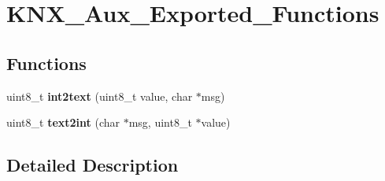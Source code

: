 \hypertarget{group___k_n_x___aux___exported___functions}{}\section{K\+N\+X\+\_\+\+Aux\+\_\+\+Exported\+\_\+\+Functions}
\label{group___k_n_x___aux___exported___functions}
\subsection*{Functions}
\begin{DoxyCompactItemize}
\item 
uint8\+\_\+t {\bfseries int2text} (uint8\+\_\+t value, char $\ast$msg)\hypertarget{group___k_n_x___aux___exported___functions_gab453e2971ca45bd5e63b995dfedffe20}{}\label{group___k_n_x___aux___exported___functions_gab453e2971ca45bd5e63b995dfedffe20}

\item 
uint8\+\_\+t {\bfseries text2int} (char $\ast$msg, uint8\+\_\+t $\ast$value)\hypertarget{group___k_n_x___aux___exported___functions_ga8fdc34a6aa7b88b181080462511acac7}{}\label{group___k_n_x___aux___exported___functions_ga8fdc34a6aa7b88b181080462511acac7}

\end{DoxyCompactItemize}


\subsection{Detailed Description}
